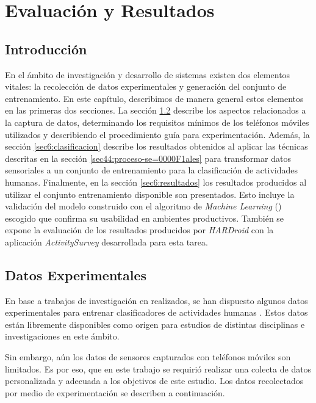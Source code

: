 
\chapter{Evaluación y Resultados}

\label{chap6:evaluacion}

\section{Introducción}

En el ámbito de investigación y desarrollo de sistemas 
existen dos elementos vitales: la recolección de datos experimentales
y generación del conjunto de entrenamiento. En este capítulo, describimos
de manera general estos elementos en las primeras dos secciones. La
sección \ref{sec6:recoleccion} describe los aspectos relacionados
a la captura de datos, determinando los requisitos mínimos de los
teléfonos móviles utilizados y describiendo el procedimiento guía
para experimentación. Además, la sección \ref{sec6:clasificacion}
describe los resultados obtenidos al aplicar las técnicas descritas
en la sección \ref{sec44:proceso-se=0000F1ales} para transformar
datos sensoriales a un conjunto de entrenamiento para la clasificación
de actividades humanas. Finalmente, en la sección \ref{sec6:resultados}
los resultados producidos al utilizar el conjunto entrenamiento disponible
son presentados. Esto incluye la validación del modelo construido
con el algoritmo de \emph{Machine Learning} () escogido
que confirma su usabilidad en ambientes productivos. También se expone
la evaluación de los resultados producidos por \emph{HARDroid }con
la aplicación \emph{ActivitySurvey} desarrollada para esta tarea.

\section{Datos Experimentales}

\label{sec6:recoleccion}En base a trabajos de investigación en 
realizados, se han dispuesto algunos datos experimentales para entrenar
clasificadores de actividades humanas \cite{ReyesOrtiz2013,Anguita2013}.
Estos datos están libremente disponibles como origen para estudios
de distintas disciplinas e investigaciones en este ámbito. 

Sin embargo, aún los datos de sensores capturados con teléfonos móviles
son limitados. Es por eso, que en este trabajo se requirió realizar
una colecta de datos personalizada y adecuada a los objetivos de este
estudio. Los datos recolectados por medio de experimentación se describen
a continuación.

